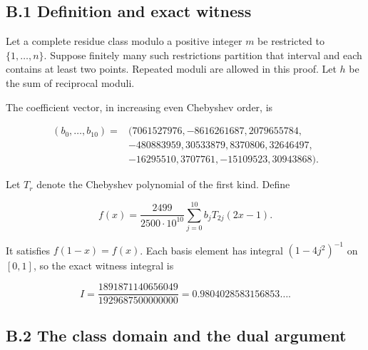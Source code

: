 \documentclass[11pt,a4paper]{article}
\begin{document}

\hypertarget{b.1-definition-and-exact-witness}{%
\subsection{B.1 Definition and exact
witness}\label{b.1-definition-and-exact-witness}}

Let a complete residue class modulo a positive integer \(m\) be
restricted to \(\{1,\ldots,n\}\). Suppose finitely many such
restrictions partition that interval and each contains at least two
points. Repeated moduli are allowed in this proof. Let \(h\) be the sum
of reciprocal moduli.

\begin{samepage}

The coefficient vector, in increasing even Chebyshev order, is

\[
\begin{aligned}
(b_0,\ldots,b_{10})={}&(7061527976,-8616261687,2079655784,\\
&-480883959,30533879,8370806,32646497,\\
&-16295510,3707761,-15109523,30943868).
\end{aligned}
\]

\end{samepage}

\begin{samepage}

Let \(T_r\) denote the Chebyshev polynomial of the first kind. Define

\[f(x)=\frac{2499}{2500\cdot10^{10}}\sum_{j=0}^{10} b_jT_{2j}(2x-1).\]

\end{samepage}

\begin{samepage}

It satisfies \(f(1-x)=f(x)\). Each basis element has integral
\((1-4j^2)^{-1}\) on \([0,1]\), so the exact witness integral is

\[I=\frac{1891871140656049}{1929687500000000}=0.9804028583156853\ldots.\]

\end{samepage}


\hypertarget{b.2-the-class-domain-and-the-dual-argument}{%
\subsection{B.2 The class domain and the dual
argument}\label{b.2-the-class-domain-and-the-dual-argument}}
\end{document}
